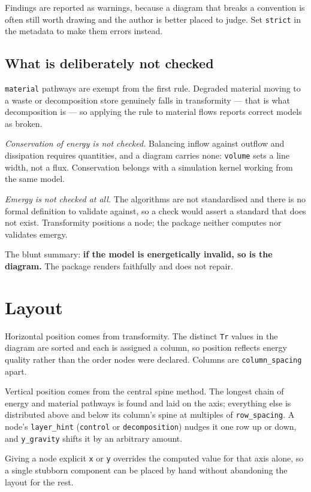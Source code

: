 \documentclass{article}
\begin{document}
Findings are reported as warnings, because a diagram that breaks a convention is
often still worth drawing and the author is better placed to judge. Set
\texttt{strict} in the metadata to make them errors instead.

\subsection{What is deliberately not checked}

\texttt{material} pathways are exempt from the first rule. Degraded material
moving to a waste or decomposition store genuinely falls in transformity --- that
is what decomposition is --- so applying the rule to material flows reports
correct models as broken.

\emph{Conservation of energy is not checked.} Balancing inflow against outflow
and dissipation requires quantities, and a diagram carries none: \texttt{volume}
sets a line width, not a flux. Conservation belongs with a simulation kernel
working from the same model.

\emph{Emergy is not checked at all.} The algorithms are not standardised and
there is no formal definition to validate against, so a check would assert a
standard that does not exist. Transformity positions a node; the package neither
computes nor validates emergy.

The blunt summary: \textbf{if the model is energetically invalid, so is the
diagram.} The package renders faithfully and does not repair.

\section{Layout}

Horizontal position comes from transformity. The distinct \texttt{Tr} values in
the diagram are sorted and each is assigned a column, so position reflects
energy quality rather than the order nodes were declared. Columns are
\texttt{column\_spacing} apart.

Vertical position comes from the central spine method. The longest chain of
energy and material pathways is found and laid on the axis; everything else is
distributed above and below its column's spine at multiples of
\texttt{row\_spacing}. A node's \texttt{layer\_hint} (\texttt{control} or
\texttt{decomposition}) nudges it one row up or down, and \texttt{y\_gravity}
shifts it by an arbitrary amount.

Giving a node explicit \texttt{x} or \texttt{y} overrides the computed value for
that axis alone, so a single stubborn component can be placed by hand without
abandoning the layout for the rest.
\end{document}
